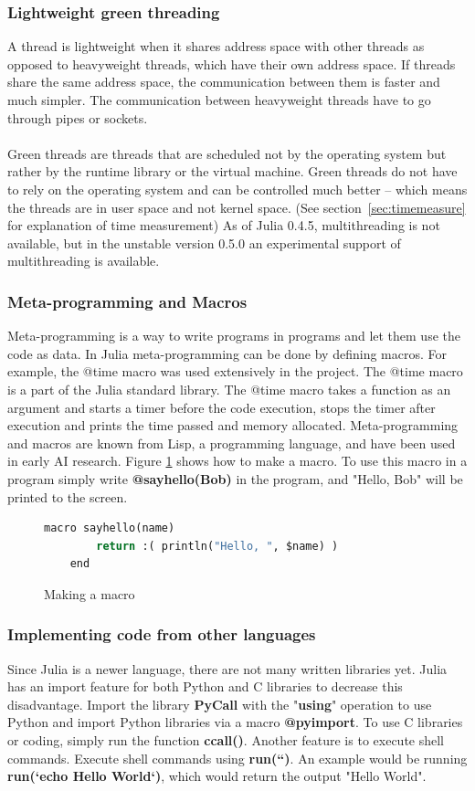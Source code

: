 \documentclass[a4paper, 11pt, titlepage]{article}
\begin{document}
\subsubsection{Lightweight green threading}
A thread is lightweight when it shares address space with other threads as opposed to heavyweight threads, which have their own address space. If threads share the same address space, the communication between them is faster and much simpler. The communication between heavyweight threads have to go through pipes or sockets. \\
\\
Green threads are threads that are scheduled not by the operating system but rather by the runtime library or the virtual machine. Green threads do not have to rely on the operating system and can be controlled much better – which means the threads are in user space and not kernel space. (See section~\ref{sec:timemeasure} for explanation of time measurement) As of Julia 0.4.5, multithreading is not available, but in the unstable version 0.5.0 an experimental support of multithreading is available. 

\subsubsection{Meta-programming and Macros}
Meta-programming is a way to write programs in programs and let them use the code as data. In Julia meta-programming can be done by defining macros. For example, the @time macro was used extensively in the project. The @time macro is a part of the Julia standard library. The @time macro takes a function as an argument and starts a timer before the code execution, stops the timer after execution and prints the time passed and memory allocated. Meta-programming and macros are known from Lisp, a programming language, and have been used in early AI research. Figure \ref{macro} shows how to make a macro. To use this macro in a program simply write \textbf{@sayhello(Bob)} in the program, and "Hello, Bob" will be printed to the screen.
\begin{figure}[H]
	\begin{lstlisting}[language=python]
	macro sayhello(name)
		return :( println("Hello, ", $name) )
	end
	\end{lstlisting}
	\caption{Making a macro}
	\label{macro}
\end{figure}

\subsubsection{Implementing code from other languages}
Since Julia is a newer language, there are not many written libraries yet. Julia has an import feature for both Python and C libraries to decrease this disadvantage. Import the library \textbf{PyCall} with the "\textbf{using}" operation to use Python and import Python libraries via a macro \textbf{@pyimport}. To use C libraries or coding, simply run the function \textbf{ccall()}. Another feature is to execute shell commands. Execute shell commands using \textbf{run(``)}. An example would be running \textbf{run(`echo Hello World`)}, which would return the output "Hello World".
\end{document}
